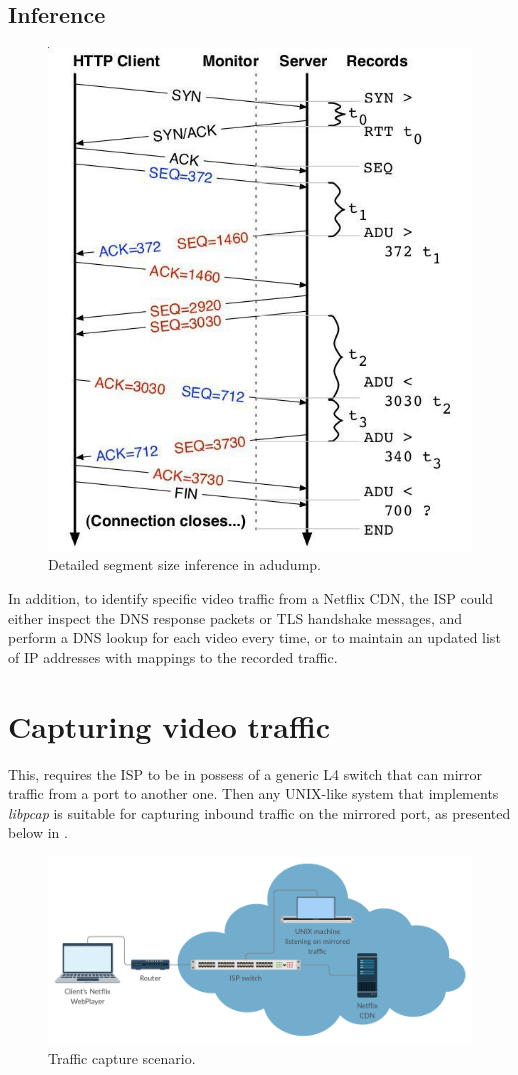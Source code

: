 
\subsection{Inference}


\begin{figure}[!htb]
  \centering
  \includegraphics[width=0.7\columnwidth]{img/adudump.png}
  \caption{Detailed segment size inference in adudump.}
  \label{fig:adudump}
\end{figure}


In addition, to identify specific video traffic from a Netflix CDN, the ISP
could either inspect the DNS response packets or TLS handshake messages, and
perform a DNS lookup for each video every time, or to maintain an updated list
of IP addresses with mappings to the recorded traffic.

\section{Capturing video traffic}

This, requires the ISP to be in possess of a generic L4 switch that can mirror
traffic from a port to another one. Then any UNIX-like system that implements
\emph{libpcap} is suitable for capturing inbound traffic on the mirrored port, as
presented below in .

\begin{figure}[!htb]
  \centering
  \includegraphics[width=0.9\columnwidth]{img/schema.png}
  \caption{Traffic capture scenario.}
  \label{fig:schema}
\end{figure}

